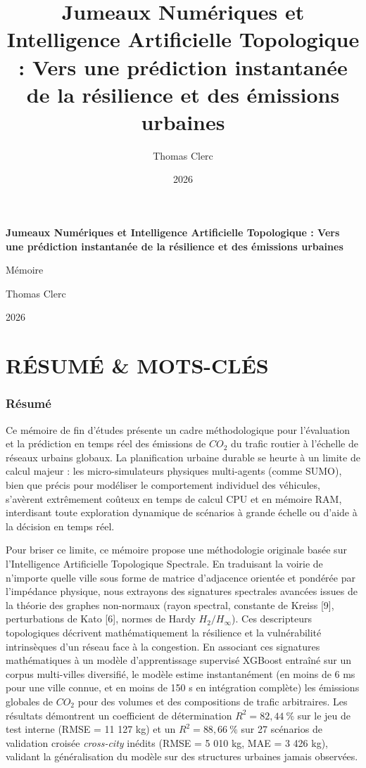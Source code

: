 \documentclass[10pt, a4paper]{article}
\title{Jumeaux Numériques et Intelligence Artificielle Topologique :
Vers une prédiction instantanée de la résilience et des émissions
urbaines}
\author{Thomas Clerc}
\date{2026}
\begin{document}
\begin{titlepage}
\centering
\vspace*{2cm}
{\Huge\bfseries Jumeaux Numériques et Intelligence Artificielle
Topologique : Vers une prédiction instantanée de la résilience et des
émissions urbaines\par}
\vspace{1.5cm}
{\Large Mémoire\par}
\vspace{1cm}
{\large Thomas Clerc\par}
\vspace{0.5cm}
{\large 2026\par}
\vfill
\end{titlepage}

\tableofcontents
\newpage

\section{RÉSUMÉ \& MOTS-CLÉS}\label{ruxe9sumuxe9-mots-cluxe9s}

\subsubsection{Résumé}\label{ruxe9sumuxe9}

Ce mémoire de fin d'études présente un cadre méthodologique pour
l'évaluation et la prédiction en temps réel des émissions de \(CO_2\) du
trafic routier à l'échelle de réseaux urbains globaux. La planification
urbaine durable se heurte à un limite de calcul majeur : les
micro-simulateurs physiques multi-agents (comme SUMO), bien que précis
pour modéliser le comportement individuel des véhicules, s'avèrent
extrêmement coûteux en temps de calcul CPU et en mémoire RAM,
interdisant toute exploration dynamique de scénarios à grande échelle ou
d'aide à la décision en temps réel.

Pour briser ce limite, ce mémoire propose une méthodologie originale
basée sur l'Intelligence Artificielle Topologique Spectrale. En
traduisant la voirie de n'importe quelle ville sous forme de matrice
d'adjacence orientée et pondérée par l'impédance physique, nous
extrayons des signatures spectrales avancées issues de la théorie des
graphes non-normaux (rayon spectral, constante de Kreiss {[}9{]},
perturbations de Kato {[}6{]}, normes de Hardy \(H_2/H_\infty\)). Ces
descripteurs topologiques décrivent mathématiquement la résilience et la
vulnérabilité intrinsèques d'un réseau face à la congestion. En
associant ces signatures mathématiques à un modèle d'apprentissage
supervisé XGBoost entraîné sur un corpus multi-villes diversifié, le
modèle estime instantanément (en moins de 6 ms pour une ville connue, et
en moins de 150 s en intégration complète) les émissions globales de
\(CO_2\) pour des volumes et des compositions de trafic arbitraires. Les
résultats démontrent un coefficient de détermination
\(R^2 = 82{,}44\ \%\) sur le jeu de test interne (RMSE = 11 127 kg) et
un \(R^2 = 88{,}66\ \%\) sur 27 scénarios de validation croisée
\emph{cross-city} inédits (RMSE = 5 010 kg, MAE = 3 426 kg), validant la
généralisation du modèle sur des structures urbaines jamais observées.
\end{document}
